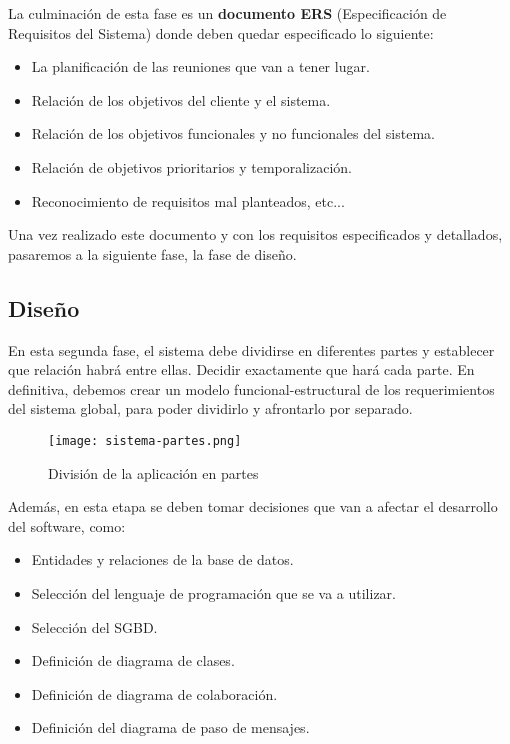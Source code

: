 La culminación de esta fase es un \textbf{documento ERS} (Especificación de Requisitos del Sistema) donde deben quedar especificado lo siguiente:

\begin{itemize}
    \item La planificación de las reuniones que van a tener lugar.
    \item Relación de los objetivos del cliente y el sistema.
    \item Relación de los objetivos funcionales y no funcionales del sistema.
    \item Relación de objetivos prioritarios y temporalización.
    \item Reconocimiento de requisitos mal planteados, etc...
\end{itemize}

Una vez realizado este documento y con los requisitos especificados y detallados, pasaremos a la siguiente fase, la fase de diseño.

\subsection{Diseño}
En esta segunda fase, el sistema debe dividirse en diferentes partes y establecer que relación habrá entre ellas. Decidir exactamente que hará cada parte. En definitiva, debemos crear un modelo funcional-estructural de los requerimientos del sistema global, para poder dividirlo y afrontarlo por separado.

\begin{figure}[ht]
    \centering
    \texttt{[image: sistema-partes.png]}
    \caption{División de la aplicación en partes}
\end{figure}

Además, en esta etapa se deben tomar decisiones que van a afectar el desarrollo del software, como:

\begin{itemize}
    \item Entidades y relaciones de la base de datos.
    \item Selección del lenguaje de programación que se va a utilizar.
    \item Selección del SGBD.
    \item Definición de diagrama de clases.
    \item Definición de diagrama de colaboración.
    \item Definición del diagrama de paso de mensajes.
\end{itemize}

